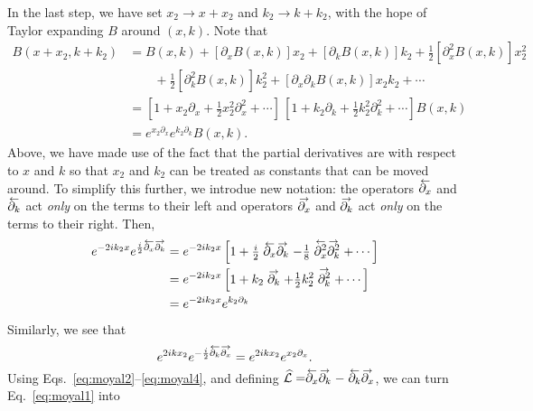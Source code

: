 %
In the last step, we have set $x_{2} \to x + x_{2}$ and $k_{2} \to k + k_{2}$, with the hope of Taylor expanding $B$ around $(x, k)$.
Note that
%
\begin{equation}
  \begin{aligned}
    B(x + x_{2}, k + k_{2}) &= B(x, k) + [\partial_{x} B(x, k)]x_{2} + [\partial_{k} B(x, k)] k_{2} + \tfrac{1}{2} [\partial^{2}_{x} B(x, k)] x_{2}^{2}\\
    &\qquad + \tfrac{1}{2} [\partial^{2}_{k} B(x, k)] k_{2}^{2} + [\partial_{x}\partial_{k} B(x, k)] x_{2}k_{2} + \cdots \\
    &= \left[1 + x_{2}\partial_{x} + \tfrac{1}{2}x_{2}^{2}\partial^{2}_{x} + \cdots \right]\,
  \left[1 + k_{2}\partial_{k} + \tfrac{1}{2}k_{2}^{2}\partial^{2}_{k} + \cdots \right] B(x, k)\\
    &= e^{x_{2}\partial_{x}} e^{k_{2}\partial_{k}} B(x, k).\label{eq:moyal2}
  \end{aligned}
\end{equation}
%
Above, we have made use of the fact that the partial derivatives are with respect to $x$ and $k$ so that $x_{2}$ and $k_{2}$ can be treated as constants that can be moved around.
To simplify this further, we introdue new notation: the operators $\ogets{\partial_{x}}$ and $\ogets{\partial_{k}}$ act \emph{only} on the terms to their left and operators $\oto{\partial_{x}}$ and $\oto{\partial_{k}}$ act \emph{only} on the terms to their right.
Then,
%
\begin{equation}
  \begin{aligned}
    e^{-2ik_{2}x} e^{\frac{i}{2}\ogets{\partial_{x}}\oto{\partial_{k}}} &= e^{-2ik_{2}x} \left[1 +  \tfrac{i}{2}\ogets{\partial_{x}}\oto{\partial_{k}} - \tfrac{1}{8}\ogets{\partial^{2}_{x}}\oto{\partial^{2}_{k}} + \cdots \right]\\
                                                            &= e^{-2ik_{2}x} \left[1 +  k_{2}\oto{\partial_{k}} + \tfrac{1}{2}k_{2}^{2}\oto{\partial^{2}_{k}} + \cdots \right]\\
                                                            &= e^{-2ik_{2}x}e^{k_{2}\partial_{k}}
  \end{aligned}\label{eq:moyal3}
\end{equation}
%
Similarly, we see that
%
\begin{equation}
  e^{2ikx_{2}}e^{-\frac{i}{2}\ogets{\partial_{k}}\oto{\partial_{x}}} = e^{2ikx_{2}}e^{x_{2}\partial_{x}}.\label{eq:moyal4}
\end{equation}
%
Using Eqs.~\eqref{eq:moyal2}--\eqref{eq:moyal4}, and defining $\widehat{\mathcal{L}} = \ogets{\partial_{x}} \oto{\partial_{k}} - \ogets{\partial_{k}}\oto{\partial_{x}}$, we can turn Eq.~\eqref{eq:moyal1} into
